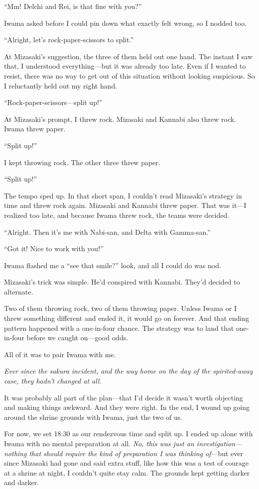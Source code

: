 \documentclass[
    a4paper,
    12pt,
    twoside,
    openany,
    UTF8,
    fontset=windows
]{ctexbook}
\begin{document}
``Mm! Delchi and Rei, is that fine with you?''

Iwama asked before I could pin down what exactly felt wrong, so I nodded too.

``Alright, let's rock-paper-scissors to split.''

At Mizasaki's suggestion, the three of them held out one hand. The instant I saw that, I understood everything---but it was already too late. Even if I wanted to resist, there was no way to get out of this situation without looking suspicious. So I reluctantly held out my right hand.

``Rock-paper-scissors---split up!''

At Mizasaki's prompt, I threw rock. Mizasaki and Kannabi also threw rock. Iwama threw paper.

``Split up!''

I kept throwing rock. The other three threw paper.

``Split up!''

The tempo sped up. In that short span, I couldn't read Mizasaki's strategy in time and threw rock again. Mizasaki and Kannabi threw paper. That was it---I realized too late, and because Iwama threw rock, the teams were decided.

``Alright. Then it's me with Nabi-san, and Delta with Gamma-san.''

``Got it! Nice to work with you!''

Iwama flashed me a ``see that smile?'' look, and all I could do was nod.

Mizasaki's trick was simple. He'd conspired with Kannabi. They'd decided to alternate.

Two of them throwing rock, two of them throwing paper. Unless Iwama or I threw something different and ended it, it would go on forever. And that ending pattern happened with a one-in-four chance. The strategy was to land that one-in-four before we caught on---good odds.

All of it was to pair Iwama with me.

\textit{Ever since the sakura incident, and the way home on the day of the spirited-away case, they hadn't changed at all.}

It was probably all part of the plan---that I'd decide it wasn't worth objecting and making things awkward. And they were right. In the end, I wound up going around the shrine grounds with Iwama, just the two of us.

For now, we set 18:30 as our rendezvous time and split up. I ended up alone with Iwama with no mental preparation at all. \textit{No, this was just an investigation---nothing that should require the kind of preparation I was thinking of}---but ever since Mizasaki had gone and said extra stuff, like how this was a test of courage at a shrine at night, I couldn't quite stay calm. The grounds kept getting darker and darker.
\end{document}
